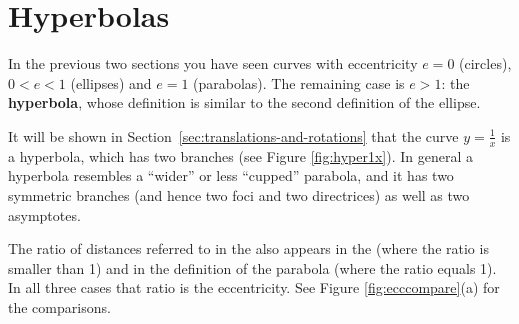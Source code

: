 \section{Hyperbolas}
In the previous two sections you have seen curves with eccentricity $e=0$
(circles), $0<e<1$ (ellipses) and $e=1$ (parabolas). The remaining case
is $e>1$: the \textbf{hyperbola}, whose definition is similar to the second
definition of the ellipse.


\piccaption[]{\label{fig:hyper1x}}
It will be shown in Section~\ref{sec:translations-and-rotations} that the curve $y=\frac{1}{x}$ is a hyperbola,
which has two branches (see Figure \ref{fig:hyper1x}). In general a
hyperbola resembles a ``wider'' or less ``cupped'' parabola, and it has two
symmetric branches (and hence two foci and two directrices) as well as two
asymptotes.

The ratio of distances referred to in the  also
appears in the  (where the ratio is smaller than
1) and in the definition of the parabola (where the ratio equals 1). In all
three cases that ratio is the eccentricity. See Figure \ref{fig:ecccompare}(a)
for the comparisons.

